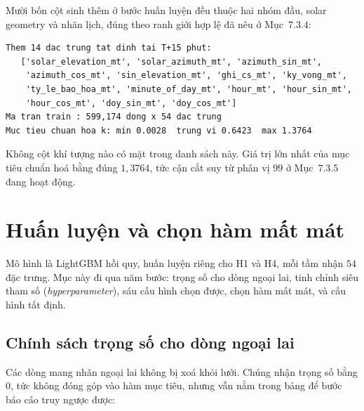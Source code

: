 Mười bốn cột  sinh thêm ở bước huấn luyện đều thuộc hai nhóm đầu, solar geometry
và nhãn lịch, đúng theo ranh giới hợp lệ đã nêu ở Mục~$7.3.4$:

\begingroup
\par{}\vspace{8pt}
\small\renewcommand{\baselinestretch}{1.0}\selectfont
\begin{verbatim}
Them 14 dac trung tat dinh tai T+15 phut:
   ['solar_elevation_mt', 'solar_azimuth_mt', 'azimuth_sin_mt',
    'azimuth_cos_mt', 'sin_elevation_mt', 'ghi_cs_mt', 'ky_vong_mt',
    'ty_le_bao_hoa_mt', 'minute_of_day_mt', 'hour_mt', 'hour_sin_mt',
    'hour_cos_mt', 'doy_sin_mt', 'doy_cos_mt']
Ma tran train : 599,174 dong x 54 dac trung
Muc tieu chuan hoa k: min 0.0028  trung vi 0.6423  max 1.3764
\end{verbatim}
\par\vspace{8pt}
\endgroup
Không cột khí tượng nào có mặt trong danh sách này. Giá trị lớn nhất của mục tiêu chuẩn hoá
bằng đúng $1{,}3764$, tức cận cắt suy từ phân vị $99$ ở Mục~$7.3.5$ đang hoạt động.

\FloatBarrier
\section{Huấn luyện và chọn hàm mất mát}

Mô hình là LightGBM hồi quy, huấn luyện riêng cho H1 và H4, mỗi tầm nhận $54$ đặc trưng.
Mục này đi qua năm bước: trọng số cho dòng ngoại lai, tinh chỉnh siêu tham số
(\textit{hyperparameter}), sáu cấu hình chọn được, chọn hàm mất mát, và cấu hình tất định.

\FloatBarrier
\subsection{Chính sách trọng số cho dòng ngoại lai}

Các dòng mang nhãn ngoại lai không bị xoá khỏi lưới. Chúng nhận trọng số bằng $0$, tức không
đóng góp vào hàm mục tiêu, nhưng vẫn nằm trong bảng để bước báo cáo truy ngược được:

